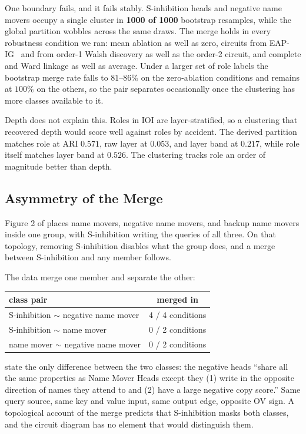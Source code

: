 \documentclass{article}
\begin{document}
One boundary fails, and it fails stably. S-inhibition heads and negative name movers occupy
a single cluster in \textbf{1000 of 1000} bootstrap resamples, while the global partition
wobbles across the same draws. The merge holds in every robustness condition we ran: mean
ablation as well as zero, circuits from EAP-IG~\citep{hanna2024faith} and from order-1 Walsh
discovery as well as
the order-2 circuit, and complete and Ward linkage as well as average. Under a larger set of
role labels the bootstrap merge rate falls to $81$--$86\%$ on the zero-ablation conditions
and remains at $100\%$ on the others, so the pair separates occasionally once the clustering
has more classes available to it.

Depth does not explain this. Roles in IOI are layer-stratified, so a clustering that
recovered depth would score well against roles by accident. The derived partition matches
role at ARI $0.571$, raw layer at $0.053$, and layer band at $0.217$, while role itself
matches layer band at $0.526$. The clustering tracks role an order of magnitude better than
depth.

\subsection{Asymmetry of the Merge}

Figure 2 of \citet{wang2022ioi} places name movers, negative name movers, and backup name
movers inside one group, with S-inhibition writing the queries of all three. On that
topology, removing S-inhibition disables what the group does, and a merge between
S-inhibition and any member follows.

The data merge one member and separate the other:

\begin{center}
\begin{tabular}{lc}
\toprule
class pair & merged in \\
\midrule
S-inhibition $\sim$ negative name mover & 4 / 4 conditions \\
S-inhibition $\sim$ name mover & 0 / 2 conditions \\
name mover $\sim$ negative name mover & 0 / 2 conditions \\
\bottomrule
\end{tabular}
\end{center}

\citet{wang2022ioi} state the only difference between the two classes: the negative heads
``share all the same properties as Name Mover Heads except they (1) write in the opposite
direction of names they attend to and (2) have a large negative copy score.'' Same query
source, same key and value input, same output edge, opposite OV sign. A topological account
of the merge predicts that S-inhibition masks both classes, and the circuit diagram has no
element that would distinguish them.
\end{document}
